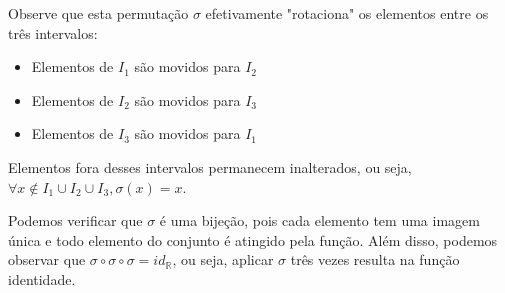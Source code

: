 \documentclass[12pt,a4paper]{article}
\begin{document}
Observe que esta permutação $\sigma$ efetivamente "rotaciona" os elementos entre os três intervalos:
\begin{itemize}
\item Elementos de $I_1$ são movidos para $I_2$
\item Elementos de $I_2$ são movidos para $I_3$
\item Elementos de $I_3$ são movidos para $I_1$
\end{itemize}

Elementos fora desses intervalos permanecem inalterados, ou seja, $\forall x \not\in I_1 \cup I_2 \cup I_3, \sigma(x) = x$.

Podemos verificar que $\sigma$ é uma bijeção, pois cada elemento tem uma imagem única e todo elemento do conjunto é atingido pela função. Além disso, podemos observar que $\sigma \circ \sigma \circ \sigma = id_{\mathbb{R}}$, ou seja, aplicar $\sigma$ três vezes resulta na função identidade.
\end{document}
